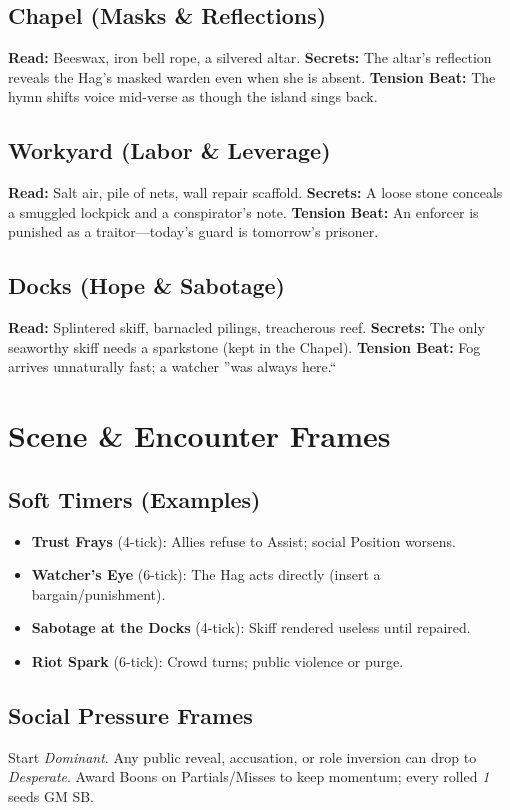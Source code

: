 \documentclass[11pt]{article}
\begin{document}
\subsection{Chapel (Masks \& Reflections)}
\textbf{Read:} Beeswax, iron bell rope, a silvered altar.  
\textbf{Secrets:} The altar's reflection reveals the Hag's masked warden even when she is absent.  
\textbf{Tension Beat:} The hymn shifts voice mid-verse as though the island sings back.

\subsection{Workyard (Labor \& Leverage)}
\textbf{Read:} Salt air, pile of nets, wall repair scaffold.  
\textbf{Secrets:} A loose stone conceals a smuggled lockpick and a conspirator's note.  
\textbf{Tension Beat:} An enforcer is punished as a traitor---today's guard is tomorrow's prisoner.

\subsection{Docks (Hope \& Sabotage)}
\textbf{Read:} Splintered skiff, barnacled pilings, treacherous reef.  
\textbf{Secrets:} The only seaworthy skiff needs a sparkstone (kept in the Chapel).  
\textbf{Tension Beat:} Fog arrives unnaturally fast; a watcher ''was always here.``

\section{Scene \& Encounter Frames}
\subsection{Soft Timers (Examples)}
\begin{itemize}
  \item \textbf{Trust Frays} (4-tick): Allies refuse to Assist; social Position worsens.
  \item \textbf{Watcher's Eye} (6-tick): The Hag acts directly (insert a bargain/punishment).
  \item \textbf{Sabotage at the Docks} (4-tick): Skiff rendered useless until repaired.
  \item \textbf{Riot Spark} (6-tick): Crowd turns; public violence or purge.
\end{itemize}

\subsection{Social Pressure Frames}
Start \emph{Dominant}. Any public reveal, accusation, or role inversion can drop to \emph{Desperate}.  
Award Boons on Partials/Misses to keep momentum; every rolled \emph{1} seeds GM SB.
\end{document}
